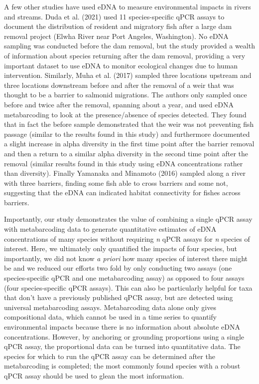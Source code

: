 \documentclass[
]{article}
\begin{document}
A few other studies have used eDNA to measure environmental impacts in
rivers and streams. Duda et al. (2021) used 11 species-specific qPCR
assays to document the distribution of resident and migratory fish after
a large dam removal project (Elwha River near Port Angeles, Washington).
No eDNA sampling was conducted before the dam removal, but the study
provided a wealth of information about species returning after the dam
removal, providing a very important dataset to use eDNA to monitor
ecological changes due to human intervention. Similarly, Muha et al.
(2017) sampled three locations upstream and three locations downstream
before and after the removal of a weir that was thought to be a barrier
to salmonid migrations. The authors only sampled once before and twice
after the removal, spanning about a year, and used eDNA metabarcoding to
look at the presence/absence of species detected. They found that in
fact the before sample demonstrated that the weir was not preventing
fish passage (similar to the results found in this study) and
furthermore documented a slight increase in alpha diversity in the first
time point after the barrier removal and then a return to a similar
alpha diversity in the second time point after the removal (similar
results found in this study using eDNA concentrations rather than
diversity). Finally Yamanaka and Minamoto (2016) sampled along a river
with three barriers, finding some fish able to cross barriers and some
not, suggesting that the eDNA can indicated habitat connectivity for
fishes across barriers.

Importantly, our study demonstrates the value of combining a single qPCR
assay with metabarcoding data to generate quantitative estimates of eDNA
concentrations of many species without requiring \emph{n} qPCR assays
for \emph{n} species of interest. Here, we ultimately only quantified
the impacts of four species, but importantly, we did not know \emph{a
priori} how many species of interest there might be and we reduced our
efforts two fold by only conducting two assays (one species-specific
qPCR and one metabarcoding assay) as opposed to four assays (four
species-specific qPCR assays). This can also be particularly helpful for
taxa that don't have a previously published qPCR assay, but are detected
using universal metabarcoding assays. Metabarcoding data alone only
gives compositional data, which cannot be used in a time series to
quantify environmental impacts because there is no information about
absolute eDNA concentrations. However, by anchoring or grounding
proportions using a single qPCR assay, the proportional data can be
turned into quantitative data. The species for which to run the qPCR
assay can be determined after the metabarcoding is completed; the most
commonly found species with a robust qPCR assay should be used to glean
the most information.
\end{document}

